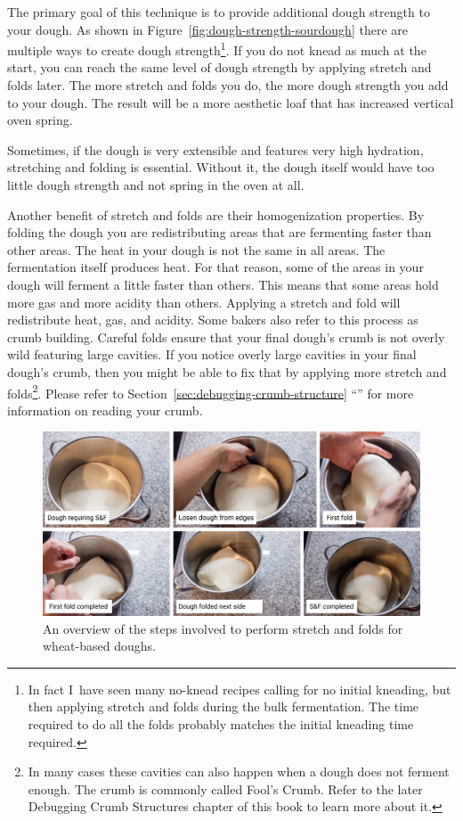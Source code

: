 The primary goal of this technique is to provide additional dough strength to
your dough. As shown in Figure~\ref{fig:dough-strength-sourdough} there are
multiple ways to create dough strength\footnote{In fact I~have seen many
    no-knead recipes calling for no initial kneading, but then applying
    stretch and folds during the bulk fermentation. The time required to do
    all the folds probably matches the initial kneading time required.}.
If you do not knead as much at the start, you can reach the same level of
dough strength by applying stretch and folds later. The more stretch and folds
you do, the more dough strength you add to your dough. The result will be a
more aesthetic loaf that has increased vertical oven spring.

Sometimes, if the dough is very extensible
and features very high hydration, stretching and folding is essential.
Without it, the dough itself would have too little dough strength and not
spring in the oven at all.

Another benefit of stretch and folds are their homogenization properties. By
folding the dough you are redistributing areas that are fermenting faster
than other areas. The heat in your dough is not the same in all areas.
The fermentation itself produces heat. For that reason, some of the areas in
your dough will ferment a little faster than others. This means that some
areas hold more gas and more acidity than others. Applying a stretch and fold
will redistribute heat, gas, and acidity. Some bakers also refer to this
process as crumb building. Careful folds ensure that your final dough's crumb
is not overly wild featuring large cavities. If you notice overly
large cavities in your final dough's crumb, then you might be able to fix that
by applying more stretch and folds\footnote{In many cases these cavities can
also happen when a dough does not ferment enough. The crumb is commonly called
Fool's Crumb. Refer to the later Debugging Crumb Structures chapter of this
book to learn more about it.}. Please refer to Section~\ref{sec:debugging-crumb-structure}
``'' for more information on reading
your crumb.

\begin{figure}[!htb]
  \centering
  \includegraphics[width=\textwidth]{stretch-and-fold-steps}
  \caption[Stretch and fold steps]{An overview of the steps involved to perform
      stretch and folds for wheat-based doughs.}%
  \label{figure:stretch-and-fold-steps}
\end{figure}

